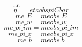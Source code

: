 \begin{dmath}
{\hat{\bar{\eta}}^C}={etaobspiCbar}
\end{dmath}
\begin{dmath}
{me\_E}={meobs\_E}
\end{dmath}
\begin{dmath}
{me\_w}={meobs\_w}
\end{dmath}
\begin{dmath}
{me\_pi\_im}={meobs\_pi\_im}
\end{dmath}
\begin{dmath}
{me\_pi\_x}={meobs\_pi\_x}
\end{dmath}
\begin{dmath}
{me\_b}={meobs\_b}
\end{dmath}
